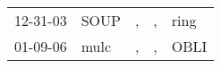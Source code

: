 \begin{supertabular}{lllll}
 12-31-03 &  SOUP &  , &  , &  ring \\
 01-09-06 &  mulc &  , &  , &  OBLI \\
\end{supertabular}
